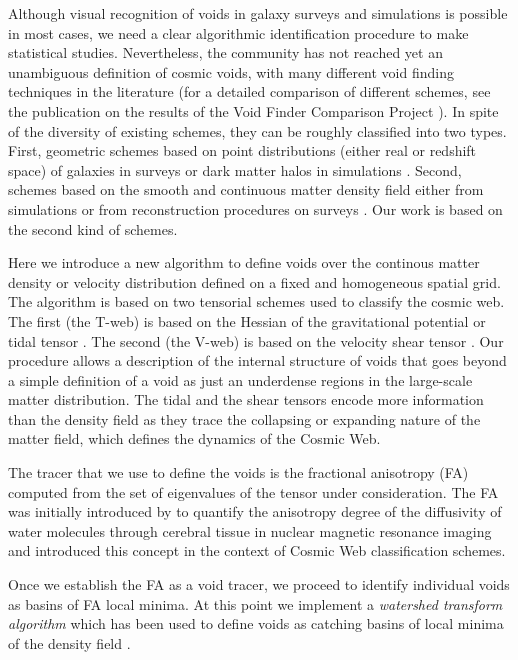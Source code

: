 \documentclass[a4,useAMS,usenatbib,usegraphicx]{mn2e}
\begin{document}
Although visual recognition of voids in galaxy surveys and simulations
is possible in most cases, we need a clear algorithmic identification
procedure to make statistical studies.
Nevertheless, the community has not reached yet an unambiguous
definition of cosmic voids, with many different void finding
techniques in the literature  (for a detailed comparison of different
schemes,  see the publication on the results of the Void Finder
Comparison Project \citet{Colberg08}).  
In spite of the diversity of existing schemes, they can be roughly
classified into two types. First, geometric schemes based on
point distributions (either real or redshift space) of galaxies in
surveys or dark matter halos in  simulations \citep{Kauffmann91, Muller00, 
  Gottlober03, Hoyle04, Brunino07,  Foster09, Micheletti14, Sutter14}.
Second, schemes based on the smooth and continuous matter density
field either from simulations or from reconstruction procedures on
surveys \citep{Plionis02, Colberg05,  Shandarin06, Platen07,
  Neyrinck08, MunozCuartas11, Neyrinck13, Ricciardelli2013}. 
Our work is based on the second kind of schemes. 


Here we introduce a new algorithm to define voids over the continous
matter density or velocity distribution defined on a fixed and
homogeneous spatial grid.
The algorithm is based on two tensorial schemes used to classify the
cosmic web. 
The first (the T-web) is based on the Hessian of the gravitational potential or
tidal tensor \citep{Hahn07, Forero09}. 
The second (the V-web) is based on the velocity shear tensor
\citep{Hoffman12}. 
Our procedure allows a description of the internal structure
of voids that goes beyond a simple definition of a void as just an
underdense regions in the large-scale matter distribution.
The tidal and the shear tensors encode more information than the
density field as they trace the collapsing or expanding
nature of the matter field, which defines the dynamics of the Cosmic
Web. 

The tracer that we use to define the voids is the fractional
anisotropy (FA) computed from the set of eigenvalues of the tensor
under consideration. 
The FA was initially introduced by \citet{Basser95} to quantify the
anisotropy degree of the diffusivity of water molecules through
cerebral tissue in nuclear magnetic resonance
imaging and \citet{Libeskind13} introduced this concept in the context
of Cosmic Web classification schemes. 

Once we establish the FA as a void tracer, we proceed to
identify individual voids as basins of FA local minima. 
At this point we implement a \textit{watershed transform algorithm}
\citep{Beucher79,Beucher93} which has been used to define voids as
catching basins of local minima of the density field
\citep{Platen07,Neyrinck08}.
\end{document}
